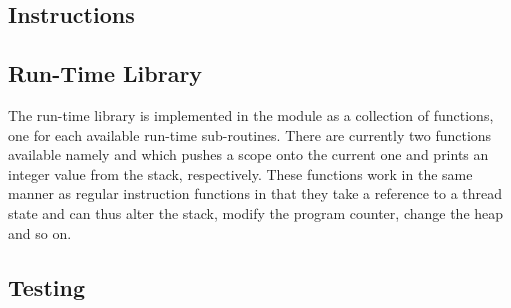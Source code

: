 \subsection{Instructions}
\label{sec:implementation:instr}


\subsection{Run-Time Library}

The run-time library is implemented in the  module as a
collection of functions, one for each available run-time sub-routines. There are
currently two functions available namely  and 
which pushes a scope onto the current one and prints an integer value from the
stack, respectively. These functions work in the same manner as regular
instruction functions in that they take a reference to a thread state and can
thus alter the stack, modify the program counter, change the heap and so on.

\subsection{Testing}


